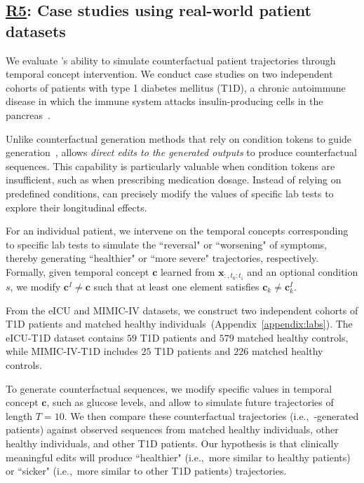 \subsection{\underline{R5}: Case studies using real-world patient datasets}

We evaluate \name's ability to simulate counterfactual patient trajectories through temporal concept intervention. We conduct case studies on two independent cohorts of patients with type 1 diabetes mellitus (T1D), a chronic autoimmune disease in which the immune system attacks insulin-producing cells in the pancreas~\cite{quattrin2023type}.

Unlike counterfactual generation methods that rely on condition tokens to guide generation~\cite{narasimhan2024time, jing2024towards, zhang2023survey}, \name allows \textit{direct edits to the generated outputs} to produce counterfactual sequences. This capability is particularly valuable when condition tokens are insufficient, such as when prescribing medication dosage. Instead of relying on predefined conditions, \name can precisely modify the values of specific lab tests to explore their longitudinal effects.

%
For an individual patient, we intervene on the temporal concepts corresponding to specific lab tests to simulate the ``reversal" or ``worsening" of symptoms, thereby generating ``healthier" or ``more severe" trajectories, respectively. Formally, given temporal concept \(\mathbf{c}\) learned from \(\mathbf{x}_{:,t_0:t_i}\) and an optional condition \(s\), we modify \(\mathbf{c}^I \neq \mathbf{c}\) such that at least one element satisfies \(\mathbf{c}_k \neq \mathbf{c}^I_k\).  

From the eICU and MIMIC-IV datasets, we construct two independent cohorts of T1D patients and matched healthy individuals~(Appendix~\ref{appendix:labs}). The eICU-T1D dataset contains \(59\) T1D patients and \(579\) matched healthy controls, while MIMIC-IV-T1D includes \(25\) T1D patients and \(226\) matched healthy controls.  

To generate counterfactual sequences, we modify specific values in temporal concept \(\mathbf{c}\), such as glucose levels, and allow \name to simulate future trajectories of length \(T = 10\). We then compare these counterfactual trajectories (i.e.,~\name-generated patients) against observed sequences from matched healthy individuals, other healthy individuals, and other T1D patients. Our hypothesis is that clinically meaningful edits will produce ``healthier" (i.e.,~more similar to healthy patients) or ``sicker" (i.e.,~more similar to other T1D patients) trajectories.  




